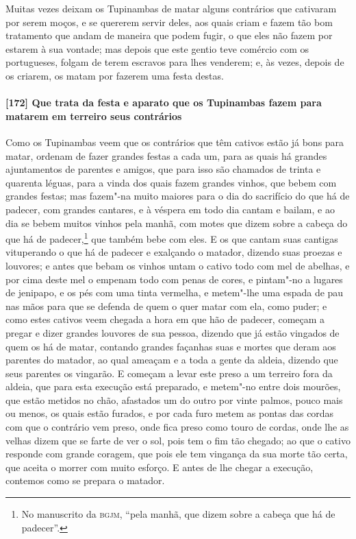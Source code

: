 Muitas vezes deixam os Tupinambas de matar alguns contrários que cativaram por serem
moços, e se quererem servir deles, aos quais criam e fazem tão bom tratamento que andam de
maneira que podem fugir, o que eles não fazem por estarem à sua vontade; mas depois que
este gentio teve comércio com os portugueses, folgam de terem escravos para lhes venderem;
e, às vezes, depois de os criarem, os matam por fazerem uma festa destas.

\paragraph{[172] Que trata da festa e aparato que os Tupinambas fazem para matarem em
terreiro seus contrários}\quad
Como os Tupinambas veem que os contrários que têm cativos estão já bons para matar,
ordenam de fazer grandes festas a cada um, para as quais há grandes ajuntamentos de
parentes e amigos, que para isso são chamados de trinta e quarenta léguas, para a vinda
dos quais fazem grandes vinhos, que bebem com grandes festas; mas fazem"-na muito maiores
para o dia do sacrifício do que há de padecer, com grandes cantares, e à véspera em todo
dia cantam e bailam, e ao dia se bebem muitos vinhos pela manhã, com motes que dizem sobre
a cabeça do que há de padecer,\footnote{ No manuscrito da \textsc{bgjm}, ``pela manhã, que
dizem sobre a cabeça que há de padecer''.} que também bebe com eles. E os que cantam suas
cantigas vituperando o que há de padecer e exalçando o matador, dizendo suas proezas e
louvores; e antes que bebam os vinhos untam o cativo todo com mel de abelhas, e por cima
deste mel o empenam todo com penas de cores, e pintam"-no a lugares de jenipapo, e os pés
com uma tinta vermelha, e metem"-lhe uma espada de pau nas mãos para que se defenda de quem
o quer matar com ela, como puder; e como estes cativos veem chegada a hora em que hão de
padecer, começam a pregar e dizer grandes louvores de sua pessoa, dizendo que já estão
vingados de quem os há de matar, contando grandes façanhas suas e mortes que deram aos
parentes do matador, ao qual ameaçam e a toda a gente da aldeia, dizendo que seus parentes
os vingarão. E começam a levar este preso a um terreiro fora da aldeia, que para esta
execução está preparado, e metem"-no entre dois mourões, que estão metidos no chão,
afastados um do outro por vinte palmos, pouco mais ou menos, os quais estão furados, e por
cada furo metem as pontas das cordas com que o contrário vem preso, onde fica preso como
touro de cordas, onde lhe as velhas dizem que se farte de ver o sol, pois tem o fim tão
chegado; ao que o cativo responde com grande coragem, que pois ele tem vingança da sua
morte tão certa, que aceita o morrer com muito esforço. E antes de lhe chegar a execução,
contemos como se prepara o matador.

